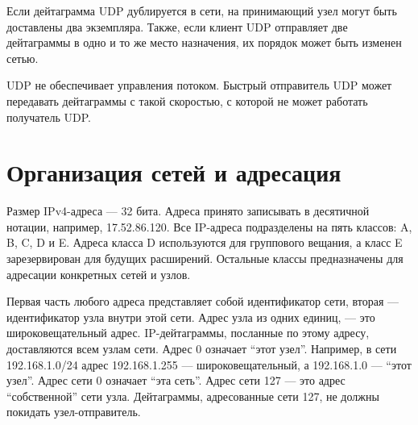Если дейтаграмма UDP дублируется в сети, на принимающий узел могут быть доставлены два экземпляра. Также, если клиент UDP отправляет две дейтаграммы в одно и то же место назначения, их порядок может быть изменен сетью.

UDP не обеспечивает управления потоком. Быстрый отправитель UDP может передавать дейтаграммы с такой скоростью, с которой не может работать получатель UDP.

\section{Организация сетей и адресация}
\label{sec:network-setup}

Размер IPv4-адреса --- 32 бита. Адреса принято записывать в десятичной нотации, например, 17.52.86.120. Все IP-адреса подразделены на пять классов: A, B, C, D и E. Адреса класса D используются для группового вещания, а класс E зарезервирован для будущих расширений. Остальные классы предназначены для адресации конкретных сетей и узлов.

Первая часть любого адреса представляет собой идентификатор сети, вторая --- идентификатор узла внутри этой сети. Адрес узла из одних единиц, --- это широковещательный адрес. IP-дейтаграммы, посланные по этому адресу, доставляются всем узлам сети. Адрес 0 означает ``этот узел''. Например, в сети 192.168.1.0/24 адрес 192.168.1.255 --- широковещательный, а 192.168.1.0 --- ``этот узел''. Адрес сети 0 означает ``эта сеть''. Адрес сети 127 --- это адрес ``собственной'' сети узла. Дейтаграммы, адресованные сети 127, не должны покидать узел-отправитель.

